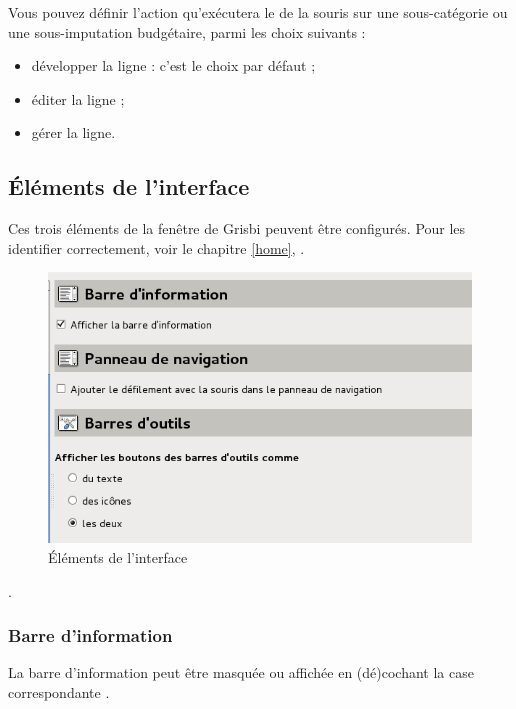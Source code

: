 Vous pouvez définir l'action qu'exécutera le  de la souris sur une sous-catégorie ou une sous-imputation budgétaire, parmi les choix suivants :
\begin{itemize}
	\item développer la ligne : c'est le choix par défaut ;
	\item éditer la ligne ;
	\item gérer la ligne.
\end{itemize}


\subsection{Éléments de l'interface\label{setup-display-toolbars}}

Ces trois éléments de la fenêtre de Grisbi peuvent être configurés. Pour les identifier correctement, voir le chapitre \vref{home},  \ifIllustration {}.
\begin{figure}[htbp]
\begin{center}
\includegraphics[scale=0.5]{image/screenshot/setup_toolbar}
\end{center}
\caption{Éléments de l'interface}
\label{setup-toolbar-img}
\end{figure}
\else .
\fi


\subsubsection{Barre d'information}

La barre d'information peut être masquée ou affichée en (dé)cochant la case correspondante . 

